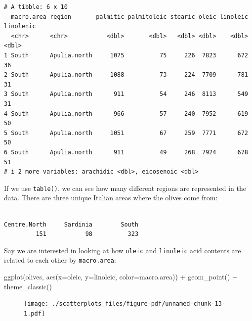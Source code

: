 \documentclass[
  letterpaper,
  DIV=11,
  numbers=noendperiod]{scrreprt}
\newenvironment{Shaded}{\begin{snugshade}}{\end{snugshade}}
\newcommand{\AttributeTok}[1]{\textcolor[rgb]{0.40,0.45,0.13}{#1}}
\newcommand{\FunctionTok}[1]{\textcolor[rgb]{0.28,0.35,0.67}{#1}}
\newcommand{\NormalTok}[1]{\textcolor[rgb]{0.00,0.23,0.31}{#1}}
\newcommand{\SpecialCharTok}[1]{\textcolor[rgb]{0.37,0.37,0.37}{#1}}
\begin{document}
\begin{verbatim}
# A tibble: 6 x 10
  macro.area region       palmitic palmitoleic stearic oleic linoleic linolenic
  <chr>      <chr>           <dbl>       <dbl>   <dbl> <dbl>    <dbl>     <dbl>
1 South      Apulia.north     1075          75     226  7823      672        36
2 South      Apulia.north     1088          73     224  7709      781        31
3 South      Apulia.north      911          54     246  8113      549        31
4 South      Apulia.north      966          57     240  7952      619        50
5 South      Apulia.north     1051          67     259  7771      672        50
6 South      Apulia.north      911          49     268  7924      678        51
# i 2 more variables: arachidic <dbl>, eicosenoic <dbl>
\end{verbatim}

If we use \texttt{table()}, we can see how many different regions are
represented in the data. There are three unique Italian areas where the
olives come from:

\begin{Shaded}
\end{Shaded}

\begin{verbatim}

Centre.North     Sardinia        South 
         151           98          323 
\end{verbatim}

Say we are interested in looking at how \texttt{oleic} and
\texttt{linoleic} acid contents are related to each other by
\texttt{macro.area}:

\begin{Shaded}
\begin{Highlighting}[]
\FunctionTok{ggplot}\NormalTok{(olives, }\FunctionTok{aes}\NormalTok{(}\AttributeTok{x=}\NormalTok{oleic, }\AttributeTok{y=}\NormalTok{linoleic, }\AttributeTok{color=}\NormalTok{macro.area)) }\SpecialCharTok{+}
  \FunctionTok{geom\_point}\NormalTok{() }\SpecialCharTok{+}
  \FunctionTok{theme\_classic}\NormalTok{()}
\end{Highlighting}
\end{Shaded}

\begin{figure}[H]

{\centering \texttt{[image: ./scatterplots\_files/figure-pdf/unnamed-chunk-13-1.pdf]}

}

\end{figure}
\end{document}
